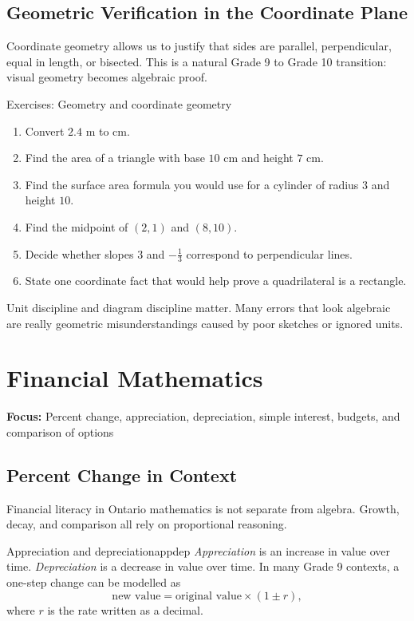 \documentclass[11pt,oneside]{book}
\newcommand{\topicline}[1]{\medskip\noindent\textbf{Focus:} #1\par\medskip}
\begin{document}
\section{Geometric Verification in the Coordinate Plane}
Coordinate geometry allows us to justify that sides are parallel, perpendicular, equal in length, or bisected. This is a natural Grade 9 to Grade 10 transition: visual geometry becomes algebraic proof.

\begin{exercisebox}{Exercises: Geometry and coordinate geometry}
\begin{enumerate}
  \item Convert $2.4$ m to cm.
  \item Find the area of a triangle with base $10$ cm and height $7$ cm.
  \item Find the surface area formula you would use for a cylinder of radius $3$ and height $10$.
  \item Find the midpoint of $(2,1)$ and $(8,10)$.
  \item Decide whether slopes $3$ and $-\frac{1}{3}$ correspond to perpendicular lines.
  \item State one coordinate fact that would help prove a quadrilateral is a rectangle.
\end{enumerate}
\end{exercisebox}

\begin{summarybox}
Unit discipline and diagram discipline matter. Many errors that look algebraic are really geometric misunderstandings caused by poor sketches or ignored units.
\end{summarybox}

\chapter{Financial Mathematics}
\topicline{Percent change, appreciation, depreciation, simple interest, budgets, and comparison of options}

\section{Percent Change in Context}
Financial literacy in Ontario mathematics is not separate from algebra. Growth, decay, and comparison all rely on proportional reasoning.

\begin{definition}{Appreciation and depreciation}{appdep}
\emph{Appreciation} is an increase in value over time. \emph{Depreciation} is a decrease in value over time. In many Grade 9 contexts, a one-step change can be modelled as
\[
\text{new value}=\text{original value}\times(1\pm r),
\]
where $r$ is the rate written as a decimal.
\end{definition}
\end{document}
